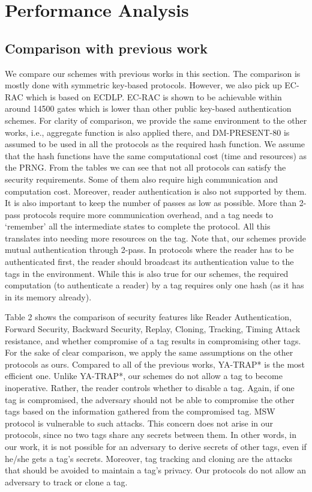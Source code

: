 \documentclass{easychair}
\begin{document}
\section{Performance Analysis}
\subsection{Comparison with previous work}
We compare our schemes with previous works in this section. The comparison is mostly done with symmetric key-based 
protocols. However, we also pick up EC-RAC\cite{ecrac4} which is based on ECDLP. EC-RAC is shown to be achievable within around 14500
 gates which is lower than other public key-based authentication schemes. For clarity of comparison, we provide the same environment to the other works, i.e., 
aggregate function is also applied there, and DM-PRESENT-80 is assumed to be used in all the protocols as the 
required hash function. We assume that the hash 
functions have the same 
computational cost (time and resources) as the PRNG. From the tables we can see that not all protocols can satisfy 
the security requirements. Some of them also require high 
communication and computation cost. Moreover, reader authentication is 
also not supported by them. It is also important to keep the 
number of passes as low as possible. More than 2-pass protocols require 
more communication overhead, and a tag needs to `remember' all the 
intermediate states to complete the protocol. All this translates into needing 
more resources on the tag. Note that, our schemes provide mutual authentication through 2-pass. In protocols where the
 reader has to be authenticated first, the reader should broadcast its authentication value to the tags in the 
 environment. While this is also true for our schemes, the required computation (to authenticate a reader) by 
 a tag requires only one hash (as it has  in its memory already).

Table 2 shows the comparison of security features like Reader Authentication, 
Forward Security, Backward Security, Replay, Cloning, Tracking, Timing Attack resistance, and whether compromise of a tag 
results in compromising other tags. For the sake of clear comparison, we apply the same assumptions on the other protocols as ours. Compared to all of the previous works, YA-TRAP* is the 
most efficient one. Unlike YA-TRAP*, our schemes do not allow 
a tag to become 
inoperative. Rather, the reader controls whether to disable a tag. Again, if one tag is compromised, the adversary should not be able to compromise the other tags based on the 
information gathered from the compromised tag. MSW protocol is vulnerable to such attacks. This concern does 
not arise in our protocols, since no two tags share any secrets between them. In 
other words, in our work, it is not possible for an adversary to derive secrets 
of other tags, even if he/she gets a tag's secrets. Moreover, tag tracking and cloning are the attacks that should be 
avoided to maintain a tag's privacy. Our protocols do not allow an adversary to track or clone a tag. 
\end{document}

